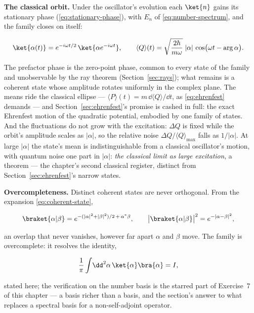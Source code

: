 \textbf{The classical orbit.} Under the oscillator's evolution each $\ket{n}$ gains its stationary phase (\eqref{eq:stationary-phase}), with $E_n$ of \eqref{eq:number-spectrum}, and the family closes on itself:
\begin{linenomath}
    \begin{equation}
        \ket{\alpha(t)} = e^{-i\omega t/2}\,\ket{\alpha e^{-i\omega t}},
        \qquad
        \langle Q\rangle(t) = \sqrt{\frac{2\hbar}{m\omega}}\;|\alpha|\,\cos\bigl(\omega t - \arg\alpha\bigr).
        \label{eq:coherent-evolution}
    \end{equation}
\end{linenomath}
The prefactor phase is the zero-point phase, common to every state of the family and unobservable by the ray theorem (Section~\ref{sec:rays}); what remains is a coherent state whose amplitude rotates uniformly in the complex plane. The means ride the classical ellipse --- $\langle P\rangle(t) = m\,\dd\langle Q\rangle/\dd t$, as \eqref{eq:ehrenfest} demands --- and Section~\ref{sec:ehrenfest}'s promise is cashed in full: the exact Ehrenfest motion of the quadratic potential, embodied by one family of states. And the fluctuations do not grow with the excitation: $\Delta Q$ is fixed while the orbit's amplitude scales as $|\alpha|$, so the relative noise $\Delta Q/\langle Q\rangle_{\max}$ falls as $1/|\alpha|$. At large $|\alpha|$ the state's mean is indistinguishable from a classical oscillator's motion, with quantum noise one part in $|\alpha|$: \emph{the classical limit as large excitation}, a theorem --- the chapter's second classical register, distinct from Section~\ref{sec:ehrenfest}'s narrow states.

\textbf{Overcompleteness.} Distinct coherent states are never orthogonal. From the expansion \eqref{eq:coherent-state},
\begin{linenomath}
    \begin{equation}
        \braket{\alpha|\beta} = e^{-(|\alpha|^2+|\beta|^2)/2 \,+\, \alpha^{*}\beta},
        \qquad
        \bigl|\braket{\alpha|\beta}\bigr|^2 = e^{-|\alpha-\beta|^2},
        \label{eq:coherent-overlap}
    \end{equation}
\end{linenomath}
an overlap that never vanishes, however far apart $\alpha$ and $\beta$ move. The family is overcomplete: it resolves the identity,
\begin{linenomath}
    \begin{equation}
        \frac{1}{\pi}\int\!\dd^2\alpha\,\ket{\alpha}\bra{\alpha} = I,
        \label{eq:coherent-resolution}
    \end{equation}
\end{linenomath}
stated here; the verification on the number basis is the starred part of Exercise~7 of this chapter --- a basis richer than a basis, and the section's answer to what replaces a spectral basis for a non-self-adjoint operator.

